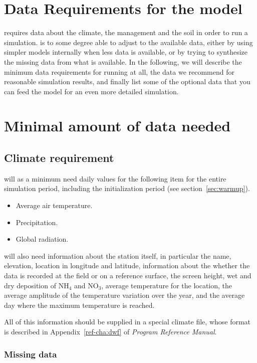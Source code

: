 \documentclass[a4paper,11pt,twoside]{article}
\newcommand{\daisyref}{\textit{\Daisy{} Program Reference Manual}}
\begin{document}
\section*{Data Requirements for the \Daisy{} model}

\Daisy{} requires data about the climate, the management and the soil
in order to run a simulation.  \Daisy{} is to some degree able to
adjust to the available data, either by using simpler models
internally when less data is available, or by trying to synthesize the
missing data from what is available.  In the following, we will
describe the minimum data requirements for running \daisy{} at all,
the data we recommend for reasonable simulation results, and finally
list some of the optional data that you can feed the model for an even
more detailed simulation.

\section{Minimal amount of data needed}
\label{sec:minimum}

\subsection{Climate requirement}

\Daisy{} will as a minimum need daily values for the following item
for the entire simulation period, including the initialization period
(see section~\ref{sec:warmup}).
\begin{itemize}
\item Average air temperature.
\item Precipitation.
\item Global radiation.
\end{itemize}
\Daisy{} will also need information about the station itself, in
particular the name, elevation, location in longitude and latitude,
information about the whether the data is recorded at the field or on
a reference surface, the screen height, wet and dry deposition of
NH$_4$ and NO$_3$, average temperature for the location, the average
amplitude of the temperature variation over the year, and the average
day where the maximum temperature is reached.

All of this information should be supplied in a special climate file,
whose format is described in Appendix~\ref{ref-cha:dwf} of
\daisyref{}.

\subsubsection{Missing data}
\end{document}
